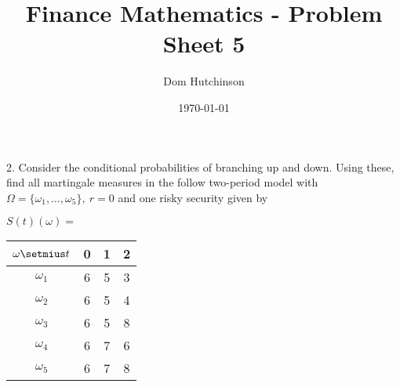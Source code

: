 \documentclass[11pt,a4paper]{article}
\begin{document}
\questionsfalse

\title{Finance Mathematics - Problem Sheet 5}
\author{Dom Hutchinson}
\date{\today}
\maketitle


\begin{question}{2.}
  Consider the conditional probabilities of branching up and down. Using these, find all martingale measures in the follow two-period model with $\Omega=\{\omega_1,\dots,\omega_5\},\ r=0$ and one risky security given by
  \begin{center}
    $S(t)(\omega)=$
    \begin{tabular}{c|ccc}
      $\omega\setmius t$&0&1&2\\\hline
      $\omega_1$&6&5&3\\
      $\omega_2$&6&5&4\\
      $\omega_3$&6&5&8\\
      $\omega_4$&6&7&6\\
      $\omega_5$&6&7&8
    \end{tabular}
  \end{center}
\end{question}
\end{document}
